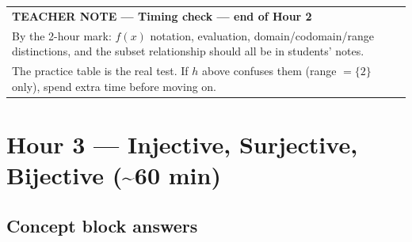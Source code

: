 \documentclass[11pt]{article}
\begin{document}
\medskip
\begin{tabular}{|p{\dimexpr\linewidth-2\tabcolsep-2\arrayrulewidth\relax}|}
\hline
{\small\bfseries\sffamily TEACHER NOTE --- Timing check --- end of Hour 2}\\[3pt]
\small By the 2-hour mark: $f(x)$ notation, evaluation, domain/codomain/range
distinctions, and the subset relationship should all be in students' notes.\\[3pt]
The practice table is the real test.
If $h$ above confuses them (range $= \{2\}$ only), spend extra time before moving on.\\[2pt]
\hline
\end{tabular}

\bigskip\bigskip


\newpage

\section*{Hour 3 --- Injective, Surjective, Bijective (\textasciitilde 60 min)}

\subsection*{Concept block answers}
\end{document}
